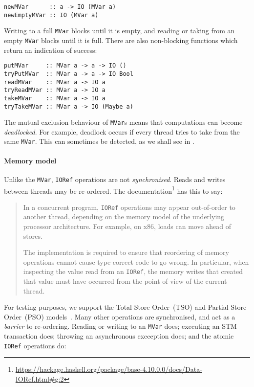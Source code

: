 \begin{verbatim}
newMVar      :: a -> IO (MVar a)
newEmptyMVar :: IO (MVar a)
\end{verbatim}

Writing to a full \verb|MVar| blocks until it is empty, and reading or taking
from an empty \verb|MVar| blocks until it is full.  There are also non-blocking
functions which return an indication of success:

\begin{verbatim}
putMVar     :: MVar a -> a -> IO ()
tryPutMVar  :: MVar a -> a -> IO Bool
readMVar    :: MVar a -> IO a
tryReadMVar :: MVar a -> IO a
takeMVar    :: MVar a -> IO a
tryTakeMVar :: MVar a -> IO (Maybe a)
\end{verbatim}

The mutual exclusion behaviour of \verb|MVar|s means that computations can
become \emph{deadlocked}.  For example, deadlock occurs if every thread tries to
take from the same \verb|MVar|.  This can sometimes be detected, as we shall see
in .

\paragraph{Memory model}
Unlike the \verb|MVar|, \verb|IORef| operations are not \emph{synchronised}.
Reads and writes between threads may be re-ordered.  The
documentation\footnote{\url{https://hackage.haskell.org/package/base-4.10.0.0/docs/Data-IORef.html\#g:2}}
has this to say:

\begin{quote}
  In a concurrent program, \verb|IORef| operations may appear out-of-order to
  another thread, depending on the memory model of the underlying processor
  architecture. For example, on x86, loads can move ahead of stores.

  The implementation is required to ensure that reordering of memory operations
  cannot cause type-correct code to go wrong. In particular, when inspecting the
  value read from an \verb|IORef|, the memory writes that created that value
  must have occurred from the point of view of the current thread.
\end{quote}

For testing purposes, we support the Total Store Order~(TSO) and Partial Store
Order~(PSO) models~.  Many other operations are
synchronised, and act as a \emph{barrier} to re-ordering.  Reading or writing to
an \verb|MVar| does; executing an STM transaction does; throwing an asynchronous
exeception does; and the atomic \verb|IORef| operations do:

